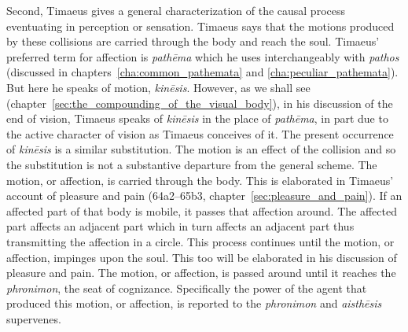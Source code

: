 Second, Timaeus gives a general characterization of the causal process eventuating in perception or sensation. Timaeus says that the motions produced by these collisions are carried through the body and reach the soul. Timaeus' preferred term for affection is \emph{pathēma} which he uses interchangeably with \emph{pathos} (discussed in chapters~\ref{cha:common_pathemata} and \ref{cha:peculiar_pathemata}). But here he speaks of motion, \emph{kinēsis}. However, as we shall see (chapter~\ref{sec:the_compounding_of_the_visual_body}), in his discussion of the end of vision, Timaeus speaks of \emph{kinēsis} in the place of \emph{pathēma}, in part due to the active character of vision as Timaeus conceives of it. The present occurrence of \emph{kinēsis} is a similar substitution. The motion is an effect of the collision and so the substitution is not a substantive departure from the general scheme. The motion, or affection, is carried through the body. This is elaborated in Timaeus' account of pleasure and pain (64a2–65b3, chapter~\ref{sec:pleasure_and_pain}). If an affected part of that body is mobile, it passes that affection around. The affected part affects an adjacent part which in turn affects an adjacent part thus transmitting the affection in a circle. This process continues until the motion, or affection, impinges upon the soul. This too will be elaborated in his discussion of pleasure and pain. The motion, or affection, is passed around until it reaches the \emph{phronimon}, the seat of cognizance. Specifically the power of the agent that produced this motion, or affection, is reported to the \emph{phronimon} and \emph{aisthēsis} supervenes. 


